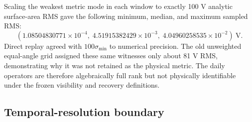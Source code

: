 \documentclass[11pt]{article}
\begin{document}
\begin{table}[ht]
\centering
\caption{Primary independent 24-hour, $L=5$ audit.  Recovery values are
relative global-RMS errors at 25-V sweep noise.}
\label{tab:primary}
\end{table}

Scaling the weakest metric mode in each window to exactly 100 V analytic
surface-area RMS gave the following minimum, median, and maximum sampled RMS:
\begin{equation*}
\left(1.08504830771\times10^{-4},\;
4.51915382429\times10^{-3},\;
4.04960258535\times10^{-2}\right)\ \mathrm{V}.
\end{equation*}
Direct replay agreed with
$100\sigma_{\min}$ to numerical precision.  The old unweighted equal-angle
grid assigned these same witnesses only about 81 V RMS, demonstrating why it
was not retained as the physical metric.  The daily operators are therefore
algebraically full rank but not physically identifiable under the frozen
visibility and recovery definitions.

\subsection{Temporal-resolution boundary}
\end{document}
